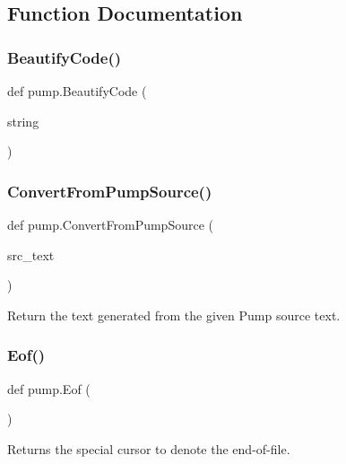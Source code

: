 \subsection{Function Documentation}
\mbox{\label{namespacepump_a3456db8d85605892d670669c4e238cd7}} 
\subsubsection{\texorpdfstring{BeautifyCode()}{BeautifyCode()}}
{\footnotesize\ttfamily def pump.\+Beautify\+Code (\begin{DoxyParamCaption}\item[{}]{string }\end{DoxyParamCaption})}

\mbox{\label{namespacepump_a568fe53d1443489ac15bac4a0f9faf91}} 
\subsubsection{\texorpdfstring{ConvertFromPumpSource()}{ConvertFromPumpSource()}}
{\footnotesize\ttfamily def pump.\+Convert\+From\+Pump\+Source (\begin{DoxyParamCaption}\item[{}]{src\+\_\+text }\end{DoxyParamCaption})}

\begin{DoxyVerb}Return the text generated from the given Pump source text.\end{DoxyVerb}
 \mbox{\label{namespacepump_a38844b22bd5a51c098b07c2c36c5c5b3}} 
\subsubsection{\texorpdfstring{Eof()}{Eof()}}
{\footnotesize\ttfamily def pump.\+Eof (\begin{DoxyParamCaption}{ }\end{DoxyParamCaption})}

\begin{DoxyVerb}Returns the special cursor to denote the end-of-file.\end{DoxyVerb}
 \mbox{\label{namespacepump_a08f2d05c192d11a134c008287bafef07}} 
